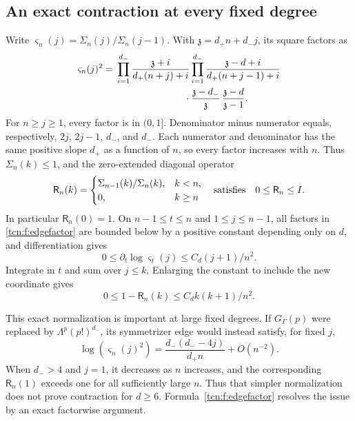 \documentclass[11pt,letterpaper]{article}
\theoremstyle{remark}
\begin{document}
\subsection{An exact contraction at every fixed degree}\label{tcn:f:sec:contraction}
Write $\varsigma_n(j)=\Sigma_n(j)/\Sigma_n(j-1)$. With $\mathfrak z=d_+n+d_-j$, its square factors as
\begin{align}
 \varsigma_n(j)^2={}&\prod_{i=1}^{d_-}\frac{\mathfrak z+i}{d_+(n+j)+i}
 \prod_{i=1}^{d_-}\frac{\mathfrak z-d+i}{d_+(n+j-1)+i}\notag\\
 &\hspace{25mm}\cdot\frac{\mathfrak z-d_-}{\mathfrak z}\,\frac{\mathfrak z-d}{\mathfrak z-1}.\label{tcn:f:edgefactor}
\end{align}
For $n\ge j\ge1$, every factor is in $(0,1]$. Denominator minus numerator equals, respectively, $2j$, $2j-1$, $d_-$, and $d_-$. Each numerator and denominator has the same positive slope $d_+$ as a function of $n$, so every factor increases with $n$. Thus $\Sigma_n(k)\le1$, and the zero-extended diagonal operator
\begin{equation}\label{tcn:f:R}
 \mathsf R_n(k)=\begin{cases}\Sigma_{n-1}(k)/\Sigma_n(k),&k<n,\\0,&k\ge n\end{cases}
 \quad\hbox{satisfies}\quad 0\le \mathsf R_n\le I.
\end{equation}
In particular $\mathsf R_n(0)=1$. On $n-1\le t\le n$ and $1\le j\le n-1$, all factors in \eqref{tcn:f:edgefactor} are bounded below by a positive constant depending only on $d$, and differentiation gives
\[
 0\le\partial_t\log \varsigma_t(j)\le C_d(j+1)/n^2.
\]
Integrate in $t$ and sum over $j\le k$. Enlarging the constant to include the new coordinate gives
\begin{equation}\label{tcn:f:Rdefect}
 0\le1-\mathsf R_n(k)\le C_d k(k+1)/n^2.
\end{equation}

This exact normalization is important at large fixed degrees. If $G_\Gamma(p)$ were replaced by $\Lambda^p(p!)^{d_-}$, its symmetrizer edge would instead satisfy, for fixed $j$,
\[
 \log(\varsigma_n(j)^2)=\frac{d_-(d_--4j)}{d_+n}+O(n^{-2}).
\]
When $d_->4$ and $j=1$, it decreases as $n$ increases, and the corresponding $\mathsf R_n(1)$ exceeds one for all sufficiently large $n$. Thus that simpler normalization does not prove contraction for $d\ge6$. Formula~\eqref{tcn:f:edgefactor} resolves the issue by an exact factorwise argument.
\end{document}
